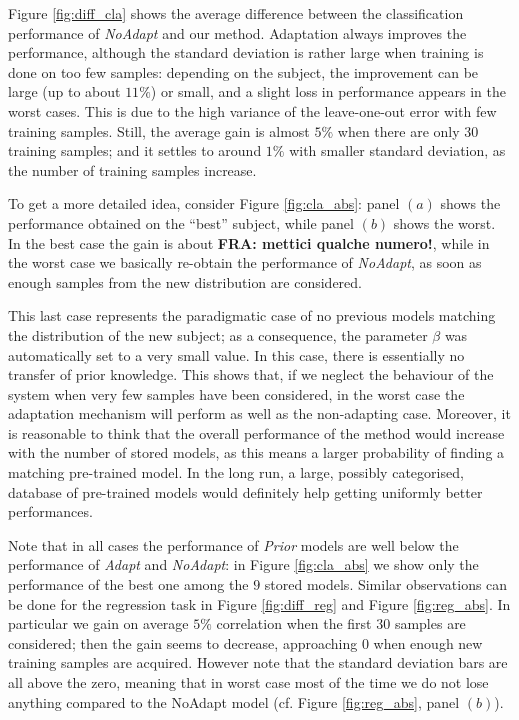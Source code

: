 Figure \ref{fig:diff_cla} shows the average difference between the
classification performance of \emph{NoAdapt} and our method.
Adaptation always improves the performance, although the standard
deviation is rather large when training is done on too few samples:
depending on the subject, the improvement can be large (up to about
$11\%$) or small, and a slight loss in performance appears in the
worst cases. This is due to the high variance of the leave-one-out
error with few training samples. Still, the average gain is almost
$5\%$ when there are only $30$ training samples; and it settles to
around $1\%$ with smaller standard deviation, as the number of
training samples increase.

To get a more detailed idea, consider Figure \ref{fig:cla_abs}: panel
$(a)$ shows the performance obtained on the ``best'' subject, while
panel $(b)$ shows the worst. In the best case the gain is about
\textbf{FRA: mettici qualche numero!}, while in the worst case we
basically re-obtain the performance of \emph{NoAdapt}, as soon as
enough samples from the new distribution are considered.

This last case represents the paradigmatic case of no previous models
matching the distribution of the new subject; as a consequence, the
parameter $\beta$ was automatically set to a very small value. In this
case, there is essentially no transfer of prior knowledge. This shows
that, if we neglect the behaviour of the system when very few samples
have been considered, in the worst case the adaptation mechanism will
perform as well as the non-adapting case. Moreover, it is reasonable
to think that the overall performance of the method would increase
with the number of stored models, as this means a larger probability
of finding a matching pre-trained model. In the long run, a large,
possibly categorised, database of pre-trained models would definitely
help getting uniformly better performances.

Note that in all cases the performance of \emph{Prior} models are
well below the performance of \emph{Adapt} and \emph{NoAdapt}: in
Figure \ref{fig:cla_abs} we show only the performance of the best one
among the $9$ stored models. Similar observations can be done for the
regression task in Figure \ref{fig:diff_reg} and Figure
\ref{fig:reg_abs}. In particular we gain on average $5\%$ correlation
when the first $30$ samples are considered; then the gain seems to
decrease, approaching $0$ when enough new training samples are
acquired. However note that the standard deviation bars are all above
the zero, meaning that in worst case most of the time we do not lose
anything compared to the NoAdapt model (cf. Figure \ref{fig:reg_abs},
panel $(b)$).

